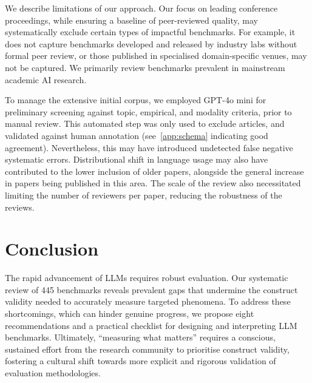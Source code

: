 We describe limitations of our approach. Our focus on leading conference proceedings, while ensuring a baseline of peer-reviewed quality, may systematically exclude certain types of impactful benchmarks. For example, it does not capture benchmarks developed and released by industry labs without formal peer review, or those published in specialised domain-specific venues, may not be captured. We primarily review benchmarks prevalent in mainstream academic AI research.

To manage the extensive initial corpus, we employed GPT-4o mini for preliminary screening against topic, empirical, and modality criteria, prior to manual review. This automated step was only used to exclude articles, and validated against human annotation (see~\cref{app:schema} indicating good agreement). Nevertheless, this may have introduced undetected false negative systematic errors. Distributional shift in language usage may also have contributed to the lower inclusion of older papers, alongside the general increase in papers being published in this area. The scale of the review also necessitated limiting the number of reviewers per paper, reducing the robustness of the reviews.

\section{Conclusion}
The rapid advancement of LLMs requires robust evaluation. Our systematic review of 445 benchmarks reveals prevalent gaps that undermine the construct validity needed to accurately measure targeted phenomena. To address these shortcomings, which can hinder genuine progress, we propose eight recommendations and a practical checklist for designing and interpreting LLM benchmarks. Ultimately, ``measuring what matters'' requires a conscious, sustained effort from the research community to prioritise construct validity, fostering a cultural shift towards more explicit and rigorous validation of evaluation methodologies.
